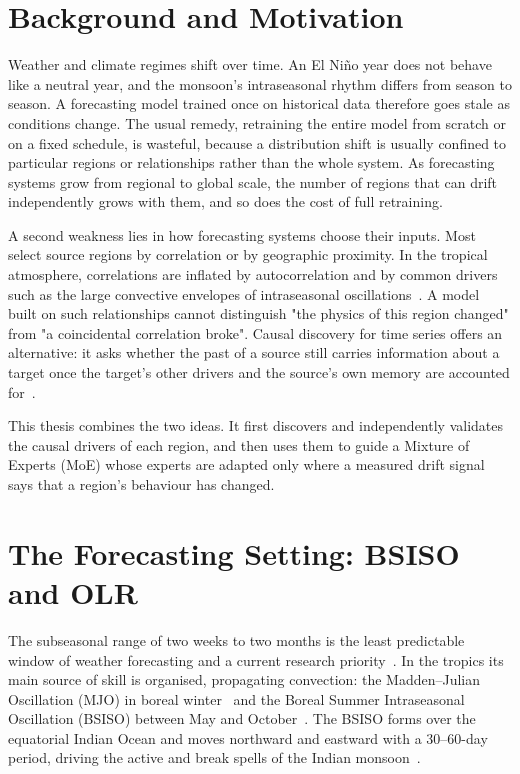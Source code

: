 \label{chap:intro}

\section{Background and Motivation}
\label{sec:intro-motivation}

Weather and climate regimes shift over time. An El Ni\~{n}o year does not behave like a neutral year, and the monsoon's intraseasonal rhythm differs from season to season. A forecasting model trained once on historical data therefore goes stale as conditions change. The usual remedy, retraining the entire model from scratch or on a fixed schedule, is wasteful, because a distribution shift is usually confined to particular regions or relationships rather than the whole system. As forecasting systems grow from regional to global scale, the number of regions that can drift independently grows with them, and so does the cost of full retraining.

A second weakness lies in how forecasting systems choose their inputs. Most select source regions by correlation or by geographic proximity. In the tropical atmosphere, correlations are inflated by autocorrelation and by common drivers such as the large convective envelopes of intraseasonal oscillations~\cite{runge2014quantifying}. A model built on such relationships cannot distinguish "the physics of this region changed" from "a coincidental correlation broke". Causal discovery for time series offers an alternative: it asks whether the past of a source still carries information about a target once the target's other drivers and the source's own memory are accounted for~\cite{runge2018causal,runge2019detecting,runge2019inferring}.

This thesis combines the two ideas. It first discovers and independently validates the causal drivers of each region, and then uses them to guide a Mixture of Experts (MoE) whose experts are adapted only where a measured drift signal says that a region's behaviour has changed.

\section{The Forecasting Setting: BSISO and OLR}
\label{sec:intro-bsiso}

The subseasonal range of two weeks to two months is the least predictable window of weather forecasting and a current research priority~\cite{vitart2017s2s}. In the tropics its main source of skill is organised, propagating convection: the Madden--Julian Oscillation (MJO) in boreal winter~\cite{madden1971detection} and the Boreal Summer Intraseasonal Oscillation (BSISO) between May and October~\cite{wang1997model,lee2013realtime}. The BSISO forms over the equatorial Indian Ocean and moves northward and eastward with a 30--60-day period, driving the active and break spells of the Indian monsoon~\cite{goswami2001intraseasonal}.

